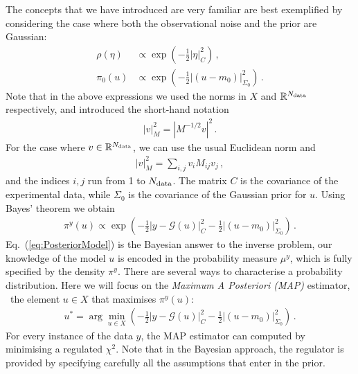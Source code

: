 The concepts that we have introduced are very familiar are best exemplified
by considering the case where both the observational noise and the
prior are Gaussian:
\begin{align}
  \label{eq:RhoGauss}
  \rho(\eta) &\propto \exp\left(
               -\frac12 \left|\eta\right|_C^2
               \right)\, , \\
  \label{eq:PiZeroGauss}
  \pi_0(u)  &\propto \exp\left(
              -\frac12 \left|(u-m_0)\right|_{\Sigma_0}^2
              \right)\, .
\end{align}
Note that in the above expressions we used the norms in $X$ and
$\mathbb{R}^{N_{\rm data}}$ respectively, and introduced the short-hand
notation
\begin{align}
  \left|v\right|_M^2 = \left| M^{-1/2} v\right|^2\, .
\end{align}
For the case where $v \in \mathbb{R}^{N_{\rm data}}$, we can use the usual
Euclidean norm  and
\begin{align}
  \left|v\right|_M^2 = \sum_{i,j} v_i M_{ij} v_j\, ,
\end{align}
and the indices $i,j$ run from 1 to $N_{\rm data}$.  The matrix $C$ is the
covariance of the experimental data, while $\Sigma_0$ is the
covariance of the Gaussian prior for $u$. Using Bayes' theorem we
obtain
\begin{align}
  \label{eq:PosteriorModel}
  \pi^y(u) \propto 
  \exp\left(
  -\frac12 \left|y - \mathcal G(u)\right|_C^2
  -\frac12 \left|(u-m_0)\right|_{\Sigma_0}^2
  \right)\, .
\end{align}
Eq.~(\ref{eq:PosteriorModel}) is the Bayesian answer to the inverse
problem, our knowledge of the model $u$ is encoded in the probability
measure $\mu^y$, which is fully specified by the density
$\pi^y$. There are several ways to characterise a probability
distribution. Here we will focus on the {\em Maximum A Posteriori
  (MAP)} estimator, \ie\ the element $u \in X$ that maximises
$\pi^y(u)$:
\begin{align}\label{eq:MAP}
  u^* = \arg\min_{u \in X} 
  \left(
  -\frac12 \left|y - \mathcal G(u)\right|_C^2
  -\frac12 \left|(u-m_0)\right|_{\Sigma_0}^2
  \right)\, .
\end{align}
For every instance of the data $y$, the MAP estimator can computed by
minimising a regulated $\chi^2$. Note that in the Bayesian approach,
the regulator is provided by specifying carefully all the assumptions
that enter in the prior. 

